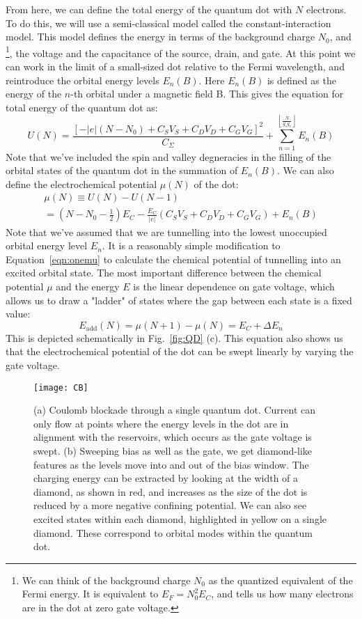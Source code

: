 From here, we can define the total energy of the quantum dot with $N$ electrons. To do this, we will use a
semi-classical model called the constant-interaction model. This model defines the energy in terms of the background charge $N_0$, and
\footnote{We can think of the background charge $N_0$ as the quantized equivalent of the Fermi energy. It is equivalent
to $E_F = N_0^2 E_C$, and tells us how many electrons are in the dot at zero gate voltage.},
the voltage and the capacitance of the source, drain, and gate. At this point we can work in the limit of
a small-sized dot relative to the Fermi wavelength, and reintroduce the orbital energy levels $E_n(B)$. Here $E_n(B)$
is defined as the energy of the $n$-th orbital under a magnetic field B. This gives the equation for total energy of the quantum
dot as:
\begin{equation}
  U(N) = \frac{[-|e|(N-N_0) + C_SV_S + C_DV_D + C_GV_G]^2}{C_\Sigma} + \sum_{n=1}^{\left\lfloor\frac{N}{g_sg_v}\right\rfloor} E_n(B)
\end{equation}
Note that we've included the spin and valley degneracies in the filling of the orbital states of the quantum dot in
the summation of $E_n(B)$. We can also define the electrochemical potential $\mu(N)$ of the dot:
\begin{multline}
  \mu(N) \equiv U(N) - U(N-1) \\
    = \left(N - N_0 - \tfrac{1}{2}\right)E_C - \frac{E_C}{|e|}\left(C_SV_S + C_DV_D + C_GV_G\right) + E_{n}(B)
  \label{eqn:onemu}
\end{multline}
Note that we've assumed that we are tunnelling into the lowest unoccupied orbital energy level $E_n$. It is a reasonably
simple modification to Equation~\ref{eqn:onemu} to calculate the chemical potential of tunnelling into an excited orbital
state. The most important difference between the chemical potential $\mu$ and the energy $E$ is the linear dependence on gate voltage,
which allows us to draw a "ladder" of states where the gap between each state is a fixed value:
\begin{equation}
  E_{\textrm{add}}(N) = \mu(N+1) - \mu(N) = E_C + \Delta E_n
\end{equation}
This is depicted schematically in Fig.~\ref{fig:QD} (c). This equation also shows us that the electrochemical
potential of the dot can be swept linearly by varying the gate voltage.

\begin{figure}
  \texttt{[image: CB]}
  \caption[Coulomb blockade in a single quantum dot]
  {\label{fig:cbtrans}(a) Coulomb blockade through a single quantum dot. Current can only flow at points
  where the energy levels in the dot are in alignment with the reservoirs, which occurs as the gate voltage
  is swept. (b) Sweeping bias as well as the gate, we get diamond-like features as the levels move into
  and out of the bias window. The charging energy can be extracted by looking at the width of a diamond, as
  shown in red, and increases as the size of the dot is reduced by a more negative confining potential. We can
  also see excited states within each diamond, highlighted in yellow on a single diamond. These correspond to orbital
  modes within the quantum dot.
  }
\end{figure}

